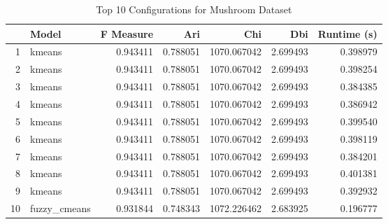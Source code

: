 \begin{table*}[ht!]
\caption{Top 10 Configurations for Mushroom Dataset}
\label{tab:top_models_mushroom}
\begin{tabular}{rlrrrrr}
 & Model & F Measure & Ari & Chi & Dbi & Runtime (s) \\\midrule

1 & kmeans & 0.943411 & 0.788051 & 1070.067042 & 2.699493 & 0.398979 \\
2 & kmeans & 0.943411 & 0.788051 & 1070.067042 & 2.699493 & 0.398254 \\
3 & kmeans & 0.943411 & 0.788051 & 1070.067042 & 2.699493 & 0.384385 \\
4 & kmeans & 0.943411 & 0.788051 & 1070.067042 & 2.699493 & 0.386942 \\
5 & kmeans & 0.943411 & 0.788051 & 1070.067042 & 2.699493 & 0.399540 \\
6 & kmeans & 0.943411 & 0.788051 & 1070.067042 & 2.699493 & 0.398119 \\
7 & kmeans & 0.943411 & 0.788051 & 1070.067042 & 2.699493 & 0.384201 \\
8 & kmeans & 0.943411 & 0.788051 & 1070.067042 & 2.699493 & 0.401381 \\
9 & kmeans & 0.943411 & 0.788051 & 1070.067042 & 2.699493 & 0.392932 \\
10 & fuzzy\_cmeans & 0.931844 & 0.748343 & 1072.226462 & 2.683925 & 0.196777 \\
\end{tabular}
\end{table*}
